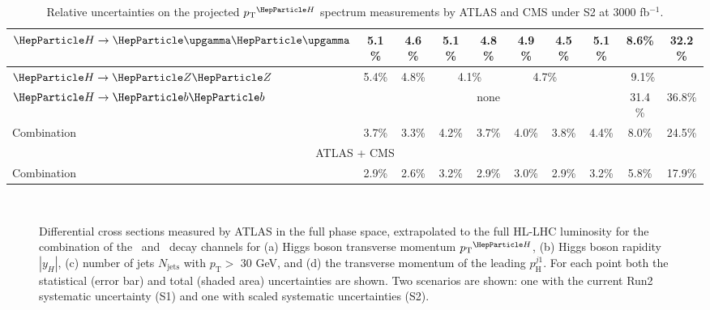 \begin{table}[th]
{\begin{tabular}{l|cccccccc|c|c|c|c|c|c|c|c}
    \hline
    $\hgg$       & \multicolumn{4}{c|}{5.1\%} & \multicolumn{4}{c|}{4.6\%} & 5.1\%                      & \multicolumn{2}{c|}{4.8\%} & 4.9\%  & 4.5\%   & 5.1\%   & 8.6\%   & 32.2\%                                           \\     
    \hline
    $\hzz$       & \multicolumn{4}{c|}{5.4\%} & \multicolumn{4}{c|}{4.8\%} & \multicolumn{3}{c|}{4.1\%} & \multicolumn{2}{c|}{4.7\%} & \multicolumn{3}{c}{9.1\%}                                                               \\ 
    \hline
    $\hbb$       & \multicolumn{14}{c|}{none} & 31.4\%                     & 36.8\%                                                                                                                                            \\ 
    \hline
    Combination  & \multicolumn{4}{c|}{3.7\%} & \multicolumn{4}{c|}{3.3\%} & 4.2\%                      & \multicolumn{2}{c|}{3.7\%} & 4.0\%  & 3.8\%   & 4.4\%   & 8.0\%   & 24.5\%                                           \\
    \hline
    \hline
    \multicolumn{17}{c}{ATLAS + CMS}                                                                                                                                                                                                   \\
    \hline
    \hline
    Combination  & \multicolumn{4}{c|}{2.9\%} & \multicolumn{4}{c|}{2.6\%} & 3.2\% & \multicolumn{2}{c|}{2.9\%} & 3.0\% & 2.9\% & 3.2\% & 5.8\% & 17.9\% \\
    \hline
    \hline
  \end{tabular}
  }
  \caption{Relative uncertainties on the projected $\pTH$ spectrum measurements by ATLAS and CMS under S2 at 3000 fb$^{-1}$.}
  \label{tab:proj_pth_unc_scen2}
\end{table}

\begin{figure}
  \centering
   \\
  \caption{Differential cross sections measured by ATLAS in the full phase space, extrapolated to the full HL-LHC luminosity for the combination of the \Hyy\ and \HZZ\ decay channels for (a) Higgs boson transverse momentum $\pTH$, (b) Higgs boson rapidity $|y_H|$, (c) number of jets $N_{\mathrm{jets}}$ with  $p_{\mathrm{T}} >$ 30 GeV, and (d) the transverse momentum of the leading $p_{\mathrm{H}}^{j1}$. For each point both the statistical (error bar) and total (shaded area) uncertainties are shown. Two scenarios are shown: one with the current Run2 systematic uncertainty (S1) and one with scaled systematic uncertainties (S2).}
   \label{fig:ATLAS_proj_differential}
\end{figure}

